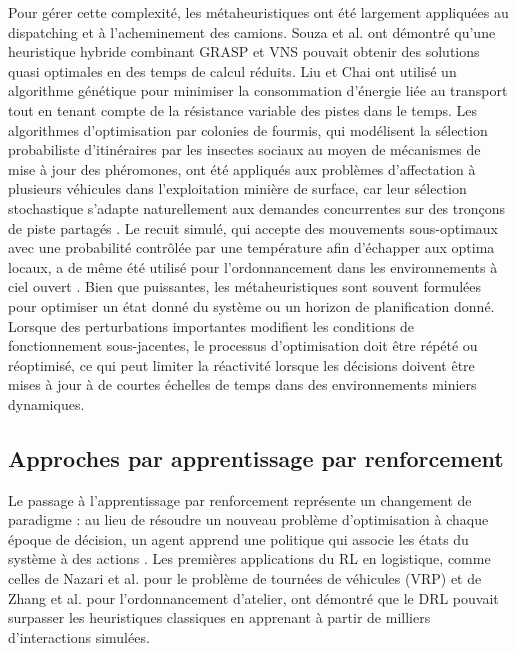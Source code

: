\documentclass[11pt,a4paper]{article}
\newif\ifrevmarks
\newcommand{\revtag}[1]{\ifrevmarks\textsuperscript{\textcolor{red!70!black}{\scriptsize[#1]}}\fi}
\newcommand{\rev}[2]{\ifrevmarks{\color{revcolor}#2}\revtag{#1}\else#2\fi}
\begin{document}
Pour gérer cette complexité, les métaheuristiques ont été largement appliquées au dispatching et à l'acheminement des camions. Souza et al. \cite{Souza2010} ont démontré qu'une heuristique hybride combinant GRASP et VNS pouvait obtenir des solutions quasi optimales en des temps de calcul réduits. Liu et Chai \cite{GuangweiLiu2019} ont utilisé un algorithme génétique pour minimiser la consommation d'énergie liée au transport tout en tenant compte de la résistance variable des pistes dans le temps. Les algorithmes d'optimisation par colonies de fourmis, qui modélisent la sélection probabiliste d'itinéraires par les insectes sociaux au moyen de mécanismes de mise à jour des phéromones, ont été appliqués aux problèmes d'affectation à plusieurs véhicules dans l'exploitation minière de surface, car leur sélection stochastique s'adapte naturellement aux demandes concurrentes sur des tronçons de piste partagés \cite{ShivPrakashUpadhyay2017}. Le recuit simulé, qui accepte des mouvements sous-optimaux avec une probabilité contrôlée par une température afin d'échapper aux optima locaux, a de même été utilisé pour l'ordonnancement dans les environnements à ciel ouvert \cite{BurakOzdemir2019}. Bien que puissantes, les métaheuristiques sont souvent formulées pour optimiser un état donné du système ou un horizon de planification donné. Lorsque des perturbations importantes modifient les conditions de fonctionnement sous-jacentes, le processus d'optimisation doit être répété ou réoptimisé, ce qui peut limiter la réactivité lorsque les décisions doivent être mises à jour à de courtes échelles de temps dans des environnements miniers dynamiques.

\subsection{Approches par apprentissage par renforcement}

Le passage à l'apprentissage par renforcement représente un changement de paradigme : au lieu de résoudre un nouveau problème d'optimisation à chaque époque de décision, un agent apprend une politique qui associe les états du système à des actions \rev{v3}{\cite{RichardSutton2018}}. Les premières applications du RL en logistique, comme celles de Nazari et al. \cite{MohammadrezaNazari2018} pour le problème de tournées de véhicules (VRP) et de Zhang et al. \cite{CongZhang2020} pour l'ordonnancement d'atelier, ont démontré que le DRL pouvait surpasser les heuristiques classiques en apprenant à partir de milliers d'interactions simulées.
\end{document}
